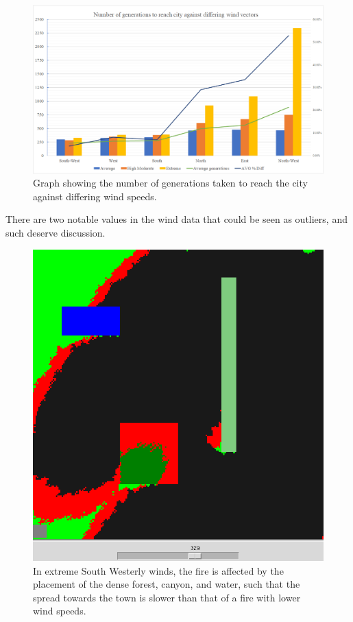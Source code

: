 \documentclass[11pt, a4paper, titlepage]{article}
\begin{document}
    
    \begin{figure}[h]
      \centering
        \includegraphics[width=\linewidth]{imgs/graphs/wind.png}
      \caption{Graph showing the number of generations taken to reach the city against differing wind speeds.}
      \label{}
    \end{figure}

    There are two notable values in the wind data that could be seen as outliers, and such deserve discussion.
  



    \begin{figure}[H]
      \centering
      \includegraphics[width=0.75\linewidth]{imgs/wind/x-15y15_gen329}
      \caption{In extreme South Westerly winds, the fire is affected by the placement of the dense forest, canyon, and water, such that the spread towards the town is slower than that of a fire with lower wind speeds.}
      \label{}
    \end{figure}
\end{document}
